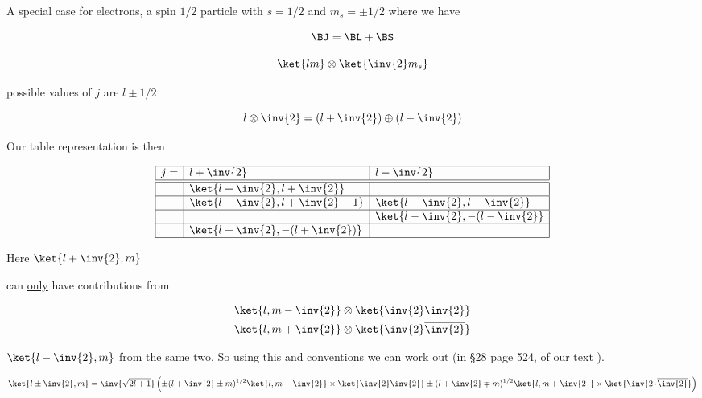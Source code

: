 A special case for electrons, a spin $1/2$ particle with $s = 1/2$ and $m_s = \pm 1/2$ where we have 

\begin{equation}\label{eqn:qmTwoL18:290}
\BJ = \BL + \BS
\end{equation}

\begin{equation}\label{eqn:qmTwoL18:310}
\ket{lm} \otimes \ket{\inv{2} m_s}
\end{equation}

possible values of $j$ are $l \pm 1/2$

\begin{equation}\label{eqn:qmTwoL18:330}
l \otimes \inv{2} = 
\left(
l + \inv{2}
\right)
\oplus
\left(
l - \inv{2}
\right)
\end{equation}

Our table representation is then

\begin{equation}\label{eqn:qmTwoL18:350}
\begin{array}{| l | l | l |}
\hline
j = & l + \inv{2} 			& l - \inv{2} \\
\hline
\hline
  &  \ket{l + \inv{2}, l + \inv{2}}	 	&					 \\
\hline
  &  \ket{l + \inv{2}, l + \inv{2} - 1}	&  \ket{l - \inv{2}, l - \inv{2}}	 \\
\hline
  &                                     & \ket{l - \inv{2}, -(l - \inv{2}}	 \\
\hline
  &  \ket{l + \inv{2}, -(l + \inv{2})}	&					 \\
\hline
\end{array}
\end{equation}

Here $\ket{l + \inv{2}, m}$

can \underline{only} have contributions from 

\begin{align}\label{eqn:qmTwoL18:370}
\ket{l, m-\inv{2}} &\otimes \ket{\inv{2}\inv{2}} \\
\ket{l, m+\inv{2}} &\otimes \ket{\inv{2}\overline{\inv{2}}}
\end{align}

$\ket{l - \inv{2}, m}$ from the same two.  So using this and conventions we can work out (in \S 28 page 524, of our text \cite{desai2009quantum}).

\begin{equation}\label{eqn:qmTwoL18:390}
\ket{l\pm \inv{2}, m} =
\inv{\sqrt{2 l + 1}}
\left(
\pm (l + \inv{2} \pm m)^{1/2}
\ket{l, m - \inv{2}} \times \ket{\inv{2}\inv{2}}
\pm (l + \inv{2} \mp m)^{1/2}
\ket{l, m + \inv{2}} \times \ket{\inv{2} \overline{\inv{2}}}
\right)
\end{equation}

